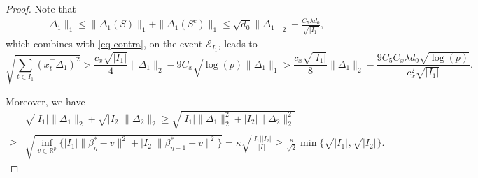 \documentclass[twoside]{article}
\begin{document}
\begin{proof}
\vskip 3mm
Note that 
	\begin{align*}
		\|\Delta_1\|_1 \leq \|\Delta_1(S)\|_1 + \|\Delta_1(S^c)\|_1 \leq \sqrt{d_0}\|\Delta_1\|_2 + \frac{C_5 \lambda d_0 }{\sqrt{|I_1|}},
	\end{align*}
	which combines with \eqref{eq-contra}, on the event $\mathcal{E}_{I_1}$, leads to
	\[
		\sqrt{\sum_{t \in I_1} (x_t^{\top}\Delta_1)^2} > \frac{c_x \sqrt{|I_1|}}{4} \|\Delta_1\|_2 - 9 C_x \sqrt{\log(p)}\|\Delta_1\|_1 > \frac{c_x \sqrt{|I_1|}}{8} \|\Delta_1\|_2 - \frac{9C_5 C_x\lambda d_0 \sqrt{\log(p)} }{c_x^2 \sqrt{|I_1|}}.
	\]

Moreover, we have
	\begin{align}
		& \sqrt{|I_1|} \|\Delta_1\|_2 + \sqrt{|I_2|} \|\Delta_2\|_2 \geq \sqrt{|I_1| \|\Delta_1\|_2^2 + |I_2| \|\Delta_2\|_2^2} \nonumber \\
		\geq & \sqrt{\inf_{v \in \mathbb{R}^p} \{|I_1| \|\beta^*_{\eta} - v\|^2 + |I_2| \|\beta^*_{\eta + 1} - v\|^2\}} = \kappa \sqrt{\frac{|I_1||I_2|}{|I|}} \geq \frac{\kappa}{\sqrt{2}}\min\{\sqrt{|I_1|}, \sqrt{|I_2|} \}. \label{eq-lower-long}
	\end{align}
	

\end{proof}
\end{document}

